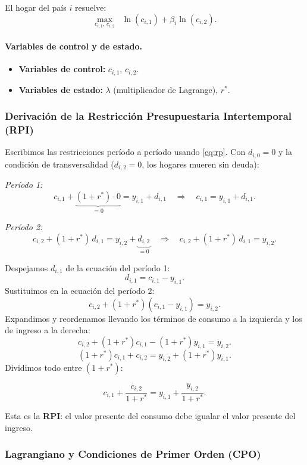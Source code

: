 El hogar del país $i$ resuelve:
\[
    \max_{c_{i,1},\, c_{i,2}} \;\; \ln(c_{i,1}) + \beta_i \ln(c_{i,2}).
\]

\paragraph{Variables de control y de estado.}
\begin{itemize}
    \item \textbf{Variables de control:} $c_{i,1}$, $c_{i,2}$.
    \item \textbf{Variables de estado:} $\lambda$ (multiplicador de Lagrange), $r^*$.
\end{itemize}

\subsubsection*{Derivación de la Restricción Presupuestaria Intertemporal (RPI)}

Escribimos las restricciones período a período usando \eqref{eq:rp}.
Con $d_{i,0}=0$ y la condición de transversalidad ($d_{i,2}=0$, los hogares
mueren sin deuda):

\medskip
\textit{Período 1:}
\[
    c_{i,1} + \underbrace{(1+r^*)\cdot 0}_{=0} = y_{i,1} + d_{i,1}
    \quad\Longrightarrow\quad
    c_{i,1} = y_{i,1} + d_{i,1}.
\]

\textit{Período 2:}
\[
    c_{i,2} + (1+r^*)\,d_{i,1} = y_{i,2} + \underbrace{d_{i,2}}_{=0}
    \quad\Longrightarrow\quad
    c_{i,2} + (1+r^*)\,d_{i,1} = y_{i,2}.
\]

Despejamos $d_{i,1}$ de la ecuación del período 1:
\[
    d_{i,1} = c_{i,1} - y_{i,1}.
\]
Sustituimos en la ecuación del período 2:
\[
    c_{i,2} + (1+r^*)(c_{i,1} - y_{i,1}) = y_{i,2}.
\]
Expandimos y reordenamos llevando los términos de consumo a la izquierda y los
de ingreso a la derecha:
\[
    c_{i,2} + (1+r^*)c_{i,1} - (1+r^*)y_{i,1} = y_{i,2}.
\]
\[
    (1+r^*)c_{i,1} + c_{i,2} = y_{i,2} + (1+r^*)y_{i,1}.
\]
Dividimos todo entre $(1+r^*)$:

\begin{equation}\label{eq:rpi}
    \boxed{c_{i,1} + \frac{c_{i,2}}{1+r^*} = y_{i,1} + \frac{y_{i,2}}{1+r^*}.}
\end{equation}

Esta es la \textbf{RPI}: el valor presente del consumo debe igualar el valor
presente del ingreso.

\subsubsection*{Lagrangiano y Condiciones de Primer Orden (CPO)}

